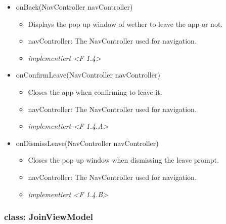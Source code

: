 \documentclass[oneside, ngerman]{sdqtechreport}
\begin{document}
\begin{itemize}
\begin{itemize}
        \end{itemize}
    \item onBack(NavController navController)
        \begin{itemize}
            \item Displays the pop up window of wether to leave the app or not.
            \item navController: The NavController used for navigation.
            \item \textit{implementiert <F 1.4>}
        \end{itemize}
    \item onConfirmLeave(NavController navController)
        \begin{itemize}
            \item Closes the app when confirming to leave it.
            \item navController: The NavController used for navigation.
            \item \textit{implementiert <F 1.4.A>}
        \end{itemize}
    \item onDismissLeave(NavController navController)
        \begin{itemize}
            \item Closes the pop up window when dismissing the leave prompt.
            \item navController: The NavController used for navigation.
            \item \textit{implementiert <F 1.4.B>}
        \end{itemize}
\end{itemize}



\subsubsection{class: JoinViewModel}
\end{document}
